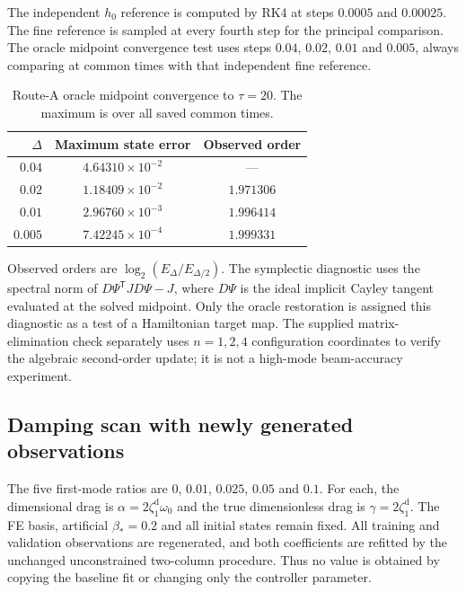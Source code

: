 The independent $h_0$ reference is computed by RK4 at steps
$0.0005$ and $0.00025$. The fine reference is sampled at every fourth
step for the principal comparison. The oracle midpoint convergence
test uses steps $0.04$, $0.02$, $0.01$ and $0.005$, always comparing
at common times with that independent fine reference.

\begin{table}[t]
\centering
\caption{Route-A oracle midpoint convergence to $\tau=20$.
The maximum is over all saved common times.}
\label{sx:order-table}
\setlength{\tabcolsep}{4pt}
\begin{tabular}{rcc}
\toprule
$\Delta$ & Maximum state error & Observed order\\
\midrule
$0.04$ & $4.64310\times10^{-2}$ & --- \\
$0.02$ & $1.18409\times10^{-2}$ & $1.971306$ \\
$0.01$ & $2.96760\times10^{-3}$ & $1.996414$ \\
$0.005$ & $7.42245\times10^{-4}$ & $1.999331$ \\
\bottomrule
\end{tabular}
\end{table}

Observed orders are $\log_2(E_\Delta/E_{\Delta/2})$.
The symplectic diagnostic uses the spectral norm of
$D\Psi^{\mathsf T}JD\Psi-J$, where $D\Psi$ is the ideal implicit
Cayley tangent evaluated at the solved midpoint. Only the oracle
restoration is assigned this diagnostic as a test of a Hamiltonian
target map. The supplied matrix-elimination check separately uses
$n=1,2,4$ configuration coordinates to verify the algebraic
second-order update; it is not a high-mode beam-accuracy experiment.

\subsection{Damping scan with newly generated observations}
\label{sx:damping}
The five first-mode ratios are $0$, $0.01$, $0.025$, $0.05$ and $0.1$.
For each, the dimensional drag is $\alpha=2\zeta_1^{\mathrm{d}}\omega_0$ and
the true dimensionless drag is $\gamma=2\zeta_1^{\mathrm{d}}$.
The FE basis, artificial $\beta_*=0.2$ and all initial states remain
fixed. All training and validation observations are regenerated,
and both coefficients are refitted by the unchanged unconstrained
two-column procedure. Thus no value is obtained by copying the
baseline fit or changing only the controller parameter.

